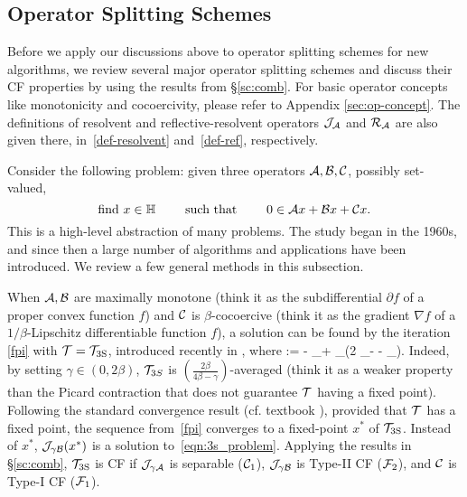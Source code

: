 \subsection{Operator Splitting Schemes}\label{sec:splitting}
Before we apply our discussions above to operator splitting schemes for new algorithms, we review several major operator splitting schemes and discuss their CF properties by using the results from \S\ref{sc:comb}. For basic operator concepts like monotonicity and cocoercivity, please refer to Appendix \ref{sec:op-concept}. The definitions of resolvent and reflective-resolvent operators ${\mathcal{J}}_{{\mathcal{A}}}$ and ${\mathcal{R}}_{{\mathcal{A}}}$ are also given there, in~\eqref{def-resolvent} and~\eqref{def-ref}, respectively.   %

Consider the following problem: given three operators ${\mathcal{A}},{\mathcal{B}},{\mathcal{C}}$, possibly set-valued,  \begin{equation}\label{eqn:3s_problem}
\text{find } x \in \HH \qquad \text{ such that }  \qquad 0 \in \cA x + \cB x +\cC x.
\end{equation}
This is a high-level abstraction of many problems. The study began in the 1960s, and since then a large number of algorithms and applications have been introduced. We review a few general methods in this subsection.

When ${\mathcal{A}}, {\mathcal{B}}$ are maximally monotone (think it as the subdifferential $\partial f$ of a proper convex function $f$) and ${\mathcal{C}}$ is $\beta$-cocoercive (think it as the gradient $\nabla f$ of a $1/\beta$-Lipschitz differentiable function $f$),  a solution can be found by the iteration \eqref{fpi} with ${\mathcal{T}}={{\mathcal{T}}_{\mathrm{3S}}}$, introduced recently in \cite{davis2015three}, where  
\beq\label{3s}
\TS := \cI- \cJ_{\gamma \cB}+ \cJ_{\gamma \cA}\circ(2 \cJ_{\gamma \cB}- \cI - \gamma \cC\circ \cJ_{\gamma \cB}).
\eeq {}Indeed, by setting  $\gamma\in(0,2\beta)$, ${\mathcal{T}}_{3S}$ is $(\frac{2\beta}{4\beta-\gamma})$-averaged (think it as a weaker property than the Picard contraction that does not guarantee ${\mathcal{T}}$ having a fixed point). Following the standard convergence result (cf. textbook \cite{B-C2011cvx-mon}), provided that ${\mathcal{T}}$ has a  fixed point, the sequence from~\eqref{fpi} converges to a fixed-point $x^*$ of ${{\mathcal{T}}_{\mathrm{3S}}}$. Instead of $x^*$, ${\mathcal{J}}_{\gamma{\mathcal{B}}}(x^*)$ is a solution to~\eqref{eqn:3s_problem}.  
Applying the results in \S\ref{sc:comb},  ${{\mathcal{T}}_{\mathrm{3S}}}$ {is CF if } ${\mathcal{J}}_{\gamma {\mathcal{A}}}$ is separable (${\mathcal{C}}_1$), ${\mathcal{J}}_{\gamma {\mathcal{B}}}$ is Type-II CF (${\mathcal{F}}_2$), and ${\mathcal{C}}$ is Type-I CF (${\mathcal{F}}_1$). %

